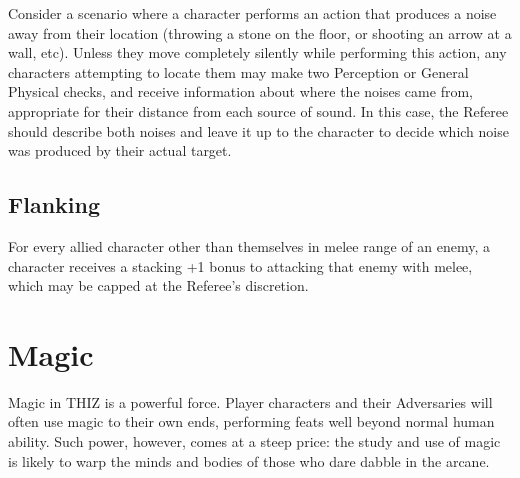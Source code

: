 \documentclass[oneside]{book}
\begin{document}
\begin{multicols}{2}
Consider a scenario where a character performs an action that produces a noise away from their location (throwing a stone on the floor, or shooting an arrow at a wall, etc). Unless they move completely silently while performing this action, any characters attempting to locate them may make two Perception or General Physical checks, and receive information about where the noises came from, appropriate for their distance from each source of sound. In this case, the Referee should describe both noises and leave it up to the character to decide which noise was produced by their actual target. 

\section{Flanking}
For every allied character other than themselves in melee range of an enemy, a character receives a stacking +1 bonus to attacking that enemy with melee, which may be capped at the Referee's discretion.

\end{multicols}

\chapter{Magic}
Magic in THIZ is a powerful force. Player characters and their Adversaries will often use magic to their own ends, performing feats well beyond normal human ability. Such power, however, comes at a steep price: the study and use of magic is likely to warp the minds and bodies of those who dare dabble in the arcane.
\end{document}
